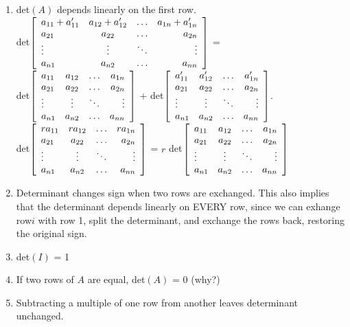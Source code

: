 \documentclass[12pt,oneside]{article}
\begin{document}
\begin{enumerate}
\item det$(A)$ depends linearly on the first row. \\ det$\left[
    \begin{array} {l c c r} a_{11} + a_{11}' & a_{12} + a_{12}' &
      \ldots & a_{1n} + a_{1n}' \\ a_{21} & a_{22} & \ldots & a_{2n} \\
      \vdots & \vdots & \ddots & \vdots \\ a_{n1} & a_{n2} & \ldots &
      a_{nn} \end{array} \right]$ = \\

det$\left[ \begin{array} {l c c r}
      a_{11} & a_{12} & \ldots & a_{1n} \\ a_{21} & a_{22} & \ldots &
      a_{2n} \\ \vdots & \vdots & \ddots & \vdots \\ a_{n1} & a_{n2} &
      \ldots & a_{nn} \end{array} \right]$ + det$\left[ \begin{array} {l c c r}
      a_{11}' & a_{12}' & \ldots & a_{1n}' \\ a_{21} & a_{22} & \ldots &
      a_{2n} \\ \vdots & \vdots & \ddots & \vdots \\ a_{n1} & a_{n2} &
      \ldots & a_{nn} \end{array} \right]$.\\

det$\left[ \begin{array} {l c c r}
      r a_{11} & r a_{12} & \ldots & r a_{1n} \\ a_{21} & a_{22} & \ldots &
      a_{2n} \\ \vdots & \vdots & \ddots & \vdots \\ a_{n1} & a_{n2} &
      \ldots & a_{nn} \end{array} \right]$ = $r$ det$\left[
      \begin{array} {l c c r}  a_{11} & a_{12} & \ldots & a_{1n} \\
      a_{21} & a_{22} & \ldots & a_{2n} \\ \vdots & \vdots & \ddots &
      \vdots \\ a_{n1} & a_{n2} & \ldots & a_{nn} \end{array} \right]$
\item Determinant changes sign when two rows are exchanged. This also
  implies that the determinant depends linearly on EVERY row, since we
  can exhange row$i$ with row 1, split the determinant, and exchange
  the rows back, restoring the original sign.
\item det$(I)$ = 1
\item If two rows of $A$ are equal, det$(A)$ = 0 (why?)
\item Subtracting a multiple of one row from another leaves
  determinant unchanged.


\end{enumerate}
\end{document}
